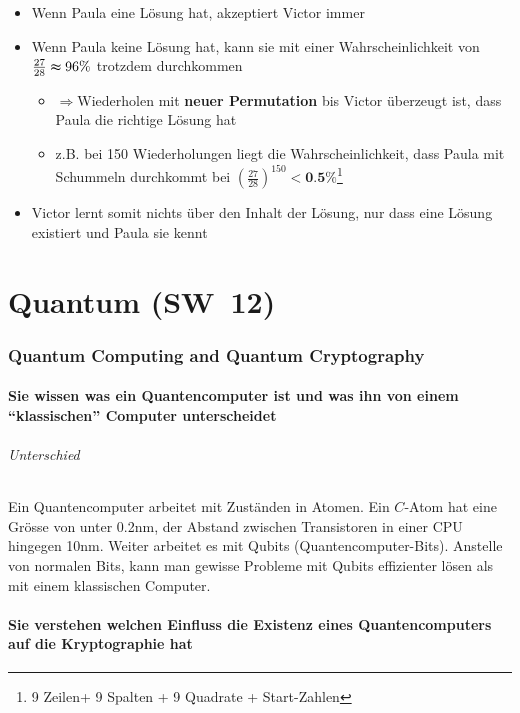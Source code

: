 \documentclass[10pt,a4paper]{article}
\begin{document}
\begin{itemize}[noitemsep,topsep=0pt,leftmargin=*]
    \item Wenn Paula eine Lösung hat, akzeptiert Victor immer
    \item Wenn Paula keine Lösung hat, kann sie mit einer Wahrscheinlichkeit von $\frac{27}{28}\thickapprox 96\%$ trotzdem durchkommen
    \begin{itemize}[noitemsep,topsep=0pt,leftmargin=*]
        \item $\Rightarrow$Wiederholen mit \textbf{neuer Permutation} bis Victor überzeugt ist, dass Paula die richtige Lösung hat
        \item z.B. bei 150 Wiederholungen liegt die Wahrscheinlichkeit, dass Paula mit Schummeln durchkommt bei $(\frac{27}{28})^{150}<\textbf{0.5\%}$\footnote{9 Zeilen+ 9 Spalten + 9 Quadrate + Start-Zahlen}
    \end{itemize}
    \item Victor lernt somit nichts über den Inhalt der Lösung, nur dass eine Lösung existiert und Paula sie kennt
\end{itemize}


\part{Quantum (SW~12)}
\section{Quantum Computing and Quantum Cryptography}
\subsection*{Sie wissen was ein Quantencomputer ist und was ihn von einem "`klassischen"' Computer unterscheidet}
\paragraph*{Unterschied}Ein Quantencomputer arbeitet mit Zuständen in Atomen. Ein $C$-Atom hat eine Grösse von unter 0.2nm, der Abstand zwischen Transistoren in einer CPU hingegen 10nm. Weiter arbeitet es mit Qubits (Quantencomputer-Bits). Anstelle von normalen Bits, kann man gewisse Probleme mit Qubits effizienter lösen als mit einem klassischen Computer.

\subsection*{Sie verstehen welchen Einfluss die Existenz eines Quantencomputers auf die Kryptographie hat}
\end{document}
